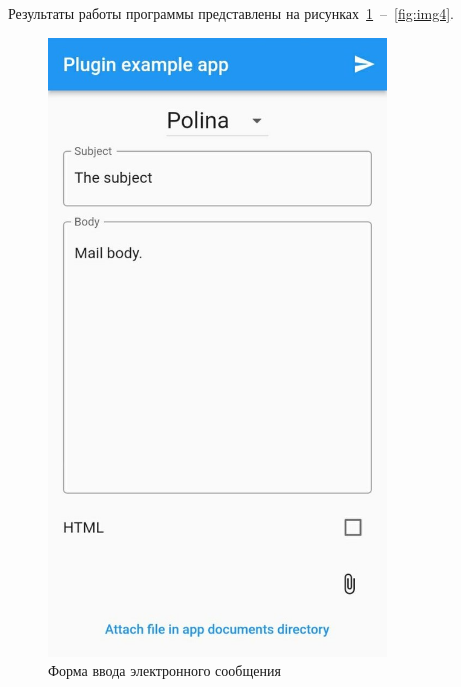 \documentclass[a4paper, 14pt]{extarticle}
\begin{document}
Результаты работы программы представлены на рисунках~\ref{fig:img1}~--~\ref{fig:img4}.

\begin{figure}[!htb]
	\centering
	\includegraphics[width=0.8\textwidth]{img1}
\caption{Форма ввода электронного сообщения}
\label{fig:img1}
\end{figure}
\end{document}
